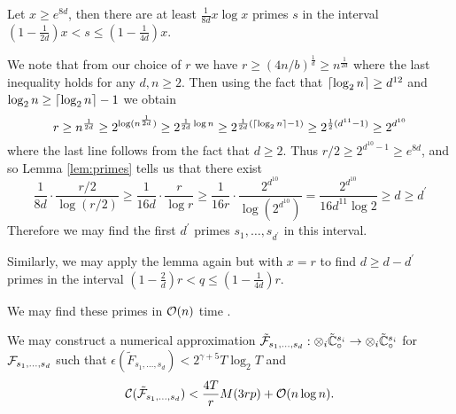 \begin{lemma}\label{lem:primes}
    Let $x \ge e^{8d}$, then there are at least $\frac{1}{8d}x \log x$ primes $s$ in the interval $(1 - \frac{1}{2d})x < s \le (1 - \frac{1}{4d})x$.
\end{lemma}

We note that from our choice of $r$ we have $r \ge (4n / b)^{\frac{1}{d}} \ge n^{\frac{1}{2d}}$ where the last inequality holds for any $d, n \ge 2$. Then using the fact that $\left \lceil \log_2 n \right \rceil \ge d^{12}$ and $\log_2 n \ge \left \lceil \log_2 n \right \rceil - 1$ we obtain
\[
    r \ge n^{\frac{1}{2d}} \ge 2^{\log(n^{\frac{1}{2d}})} \ge 2^{\frac{1}{2d} \log n} \ge 2^{\frac{1}{2d}(\left \lceil \log_2 n \right \rceil - 1)} \ge 2^{\frac{1}{2}(d^{11} - 1)} \ge 2^{d^{10}}
\]
where the last line follows from the fact that $d \ge 2$.
Thus $r/2 \ge 2^{d^{10} - 1} \ge e^{8d}$, and so Lemma \ref{lem:primes} tells us that there exist
\[
    \frac{1}{8d} \cdot \frac{r/2}{\log(r/2)} \ge \frac{1}{16d} \cdot \frac{r}{\log r} \ge \frac{1}{16r} \cdot \frac{2^{d^{10}}}{\log(2^{d^{10}})} = \frac{2^{d^{10}}}{16 d^{11}\log 2} \ge d\ge d^\prime
\]
Therefore we may find the first $d^\prime$ primes $s_1, \ldots, s_{d^\prime}$ in this interval.

Similarly, we may apply the lemma again but with $x = r$ to find $d \ge d - d^\prime$ primes in the interval $(1 - \frac{2}{d})r < q \le (1 - \frac{1}{4d})r$.

We may find these primes in $\mathcal O(n)$ time \cite{nlogn}.



\begin{proposition}
    We may construct a numerical approximation $\tilde{\mathcal F}_{s_1, \ldots, s_d}: \otimes_i \tilde{{\mathbb C}}_\circ^{s_i} \to \otimes_i \tilde{{\mathbb C}}_\circ^{s_i}$ for $\mathcal F_{s_1, \ldots, s_d}$ such that $\epsilon(\tilde{F}_{s_1, \ldots, s_d}) < 2^{\gamma + 5} T \log_2 T$ and
    \[
        \mathcal C(\tilde{\mathcal F}_{s_1, \ldots, s_d}) < \frac{4T}{r} M(3rp) + \mathcal O(n \log n).
    \]
\end{proposition}

